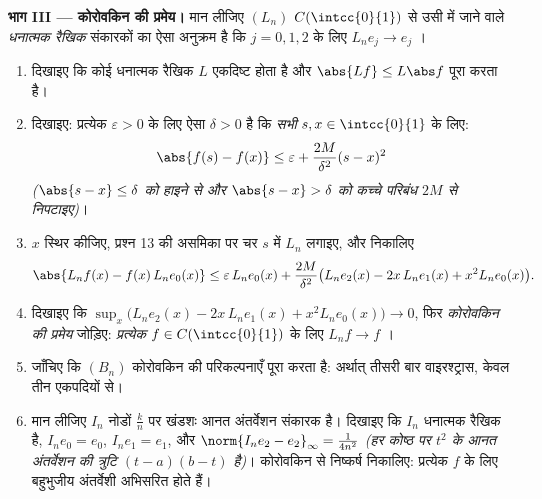 \begin{problem}
\medskip
\noindent\textbf{भाग III --- कोरोवकिन की प्रमेय।} मान लीजिए $(L_n)$ $C(\intcc{0}{1})$ से
उसी में जाने वाले \emph{धनात्मक रैखिक} संकारकों का ऐसा अनुक्रम है कि $j = 0, 1, 2$
के लिए $L_ne_j \to e_j$ ।
\begin{enumerate}[resume]
  \item दिखाइए कि कोई धनात्मक रैखिक $L$ एकदिष्ट होता है और  $\abs{Lf} \leq L\abs f$
        पूरा करता है।
  \item दिखाइए: प्रत्येक $\varepsilon > 0$ के लिए ऐसा $\delta > 0$ है कि \emph{सभी} $s, x \in \intcc{0}{1}$ के लिए:
        \[
        \abs{f(s) - f(x)} \leq \varepsilon +
        \frac{2M}{\delta^2}(s - x)^2
        \]
        \emph{($\abs{s - x} \leq \delta$ को हाइने से और $\abs{s-x} > \delta$ को कच्चे परिबंध $2M$ से निपटाइए)}।
  \item $x$ स्थिर कीजिए, प्रश्न 13 की असमिका पर चर $s$ में $L_n$ लगाइए,
        और निकालिए
        \[
        \abs{L_nf(x) - f(x)\,L_ne_0(x)}
        \leq \varepsilon\,L_ne_0(x) + \frac{2M}{\delta^2}
        \bigl(L_ne_2(x) - 2x\,L_ne_1(x) + x^2 L_ne_0(x)\bigr).
        \]
  \item दिखाइए कि $\sup_x \bigl(L_ne_2(x) - 2x\,L_ne_1(x) + x^2
        L_ne_0(x)\bigr) \to 0$, फिर \emph{कोरोवकिन की प्रमेय} जोड़िए:
        \emph{प्रत्येक} $f \in C(\intcc{0}{1})$ के लिए $L_nf \to f$ ।
  \item जाँचिए कि $(B_n)$ कोरोवकिन की परिकल्पनाएँ पूरा करता है: अर्थात्
        तीसरी बार वाइरश्ट्रास, केवल तीन एकपदियों से।
  \item मान लीजिए $I_n$ नोडों $\frac kn$ पर खंडशः आनत अंतर्वेशन संकारक है।
        दिखाइए कि $I_n$ धनात्मक रैखिक है, $I_ne_0 = e_0$, $I_ne_1 = e_1$, और
        $\norm{I_ne_2 - e_2}_\infty = \frac{1}{4n^2}$
        \emph{(हर कोष्ठ पर $t^2$ के आनत अंतर्वेशन की त्रुटि $(t - a)(b - t)$ है)}।
        कोरोवकिन से निष्कर्ष निकालिए: प्रत्येक  $f$ के लिए बहुभुजीय
        अंतर्वेशी  अभिसरित होते हैं।
\end{enumerate}


\end{problem}
